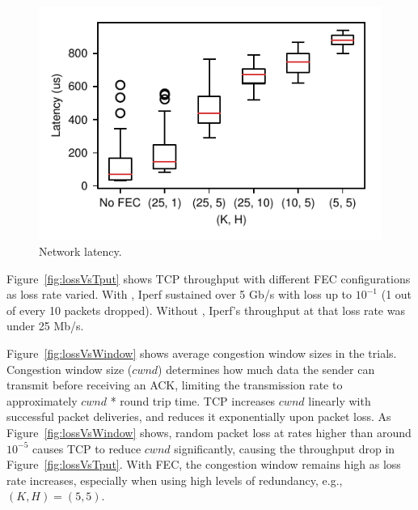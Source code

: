 \begin{figure}[!ht]
\begin{minipage}[b]{0.32\linewidth}
\includegraphics[width=\textwidth]{figures/latency.pdf}
\caption{Network latency.}
\label{fig:latency}
\end{minipage}
\end{figure}




Figure~\ref{fig:lossVsTput} shows TCP throughput with different FEC
configurations as loss rate varied. With \OurSys, Iperf sustained  over 5 Gb/s
with loss up to $10^{-1}$ (1 out of every 10 packets dropped). Without
\OurSys, Iperf's throughput at that loss rate was under 25 Mb/s. 

Figure~\ref{fig:lossVsWindow} shows average congestion window sizes in 
the trials. Congestion window size ($cwnd$) determines how much data the sender 
can transmit before receiving an ACK, limiting the transmission rate 
to approximately $cwnd$ * round trip time. TCP increases $cwnd$ linearly 
with successful packet deliveries, and reduces it exponentially upon 
packet loss. As Figure~\ref{fig:lossVsWindow} shows, random packet loss 
at rates higher than around $10^{-5}$ causes TCP to reduce $cwnd$ significantly, 
causing the throughput drop in Figure~\ref{fig:lossVsTput}. With FEC, 
the congestion window remains high as loss rate increases, especially when 
using high levels of redundancy, e.g., $(K, H) = (5, 5)$. 

